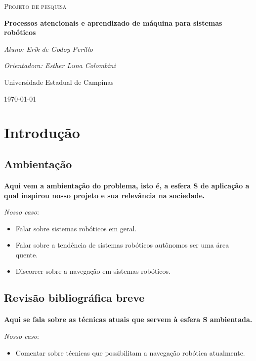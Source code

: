 \documentclass[11pt]{article}
\newcommand{\tit}[1]{\textit{#1}}
\newcommand{\tbf}[1]{\textbf{#1}}
\begin{document}
\begin{titlepage}
	\centering
	{\scshape\Large Projeto de pesquisa\par}
	\vspace{1.5cm}
	{\huge\bfseries Processos atencionais e aprendizado de máquina 
		para sistemas robóticos\par}
	\vspace{2cm}
	{\Large\itshape Aluno: Erik de Godoy Perillo\par}
	{\Large\itshape Orientadora: Esther Luna Colombini\par}
	\vfill
	Universidade Estadual de Campinas 
	\vfill
	{\large \today\par}
\end{titlepage}

\newpage

\section{Introdução}

\subsection{Ambientação}
\paragraph{}
\tbf{Aqui vem a ambientação do problema, isto é, a esfera S de aplicação
a qual inspirou nosso projeto e sua relevância na sociedade.}

\tit{Nosso caso}: 
\begin{itemize}
	\item Falar sobre sistemas robóticos em geral.
	\item Falar sobre a tendência de sistemas robóticos autônomos ser uma 
		área quente.
	\item Discorrer sobre a navegação em sistemas robóticos.
\end{itemize}

\subsection{Revisão bibliográfica breve}
\paragraph{}
\tbf{Aqui se fala sobre as técnicas atuais que servem à esfera S ambientada.}

\tit{Nosso caso}:
\begin{itemize}
	\item Comentar sobre técnicas que possibilitam a navegação robótica 
		atualmente.
\end{itemize}
\end{document}
